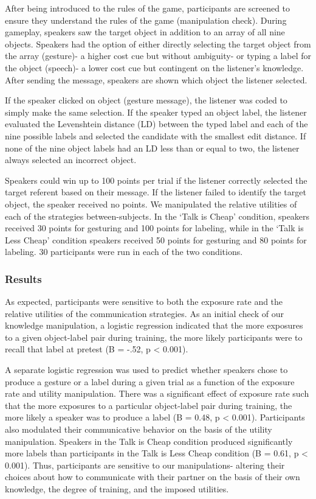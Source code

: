 \documentclass[10pt, letterpaper]{article}
\begin{document}
After being introduced to the rules of the game, participants are
screened to ensure they understand the rules of the game (manipulation
check). During gameplay, speakers saw the target object in addition to
an array of all nine objects. Speakers had the option of either directly
selecting the target object from the array (gesture)- a higher cost cue
but without ambiguity- or typing a label for the object (speech)- a
lower cost cue but contingent on the listener's knowledge. After sending
the message, speakers are shown which object the listener selected.

If the speaker clicked on object (gesture message), the listener was
coded to simply make the same selection. If the speaker typed an object
label, the listener evaluated the Levenshtein distance (LD) between the
typed label and each of the nine possible labels and selected the
candidate with the smallest edit distance. If none of the nine object
labels had an LD less than or equal to two, the listener always selected
an incorrect object.

Speakers could win up to 100 points per trial if the listener correctly
selected the target referent based on their message. If the listener
failed to identify the target object, the speaker received no points. We
manipulated the relative utilities of each of the strategies
between-subjects. In the `Talk is Cheap' condition, speakers received 30
points for gesturing and 100 points for labeling, while in the `Talk is
Less Cheap' condition speakers received 50 points for gesturing and 80
points for labeling. 30 participants were run in each of the two
conditions.

\subsubsection{Results}\label{results}

As expected, participants were sensitive to both the exposure rate and
the relative utilities of the communication strategies. As an initial
check of our knowledge manipulation, a logistic regression indicated
that the more exposures to a given object-label pair during training,
the more likely participants were to recall that label at pretest (B =
-.52, p \textless{} 0.001).

A separate logistic regression was used to predict whether speakers
chose to produce a gesture or a label during a given trial as a function
of the exposure rate and utility manipulation. There was a significant
effect of exposure rate such that the more exposures to a particular
object-label pair during training, the more likely a speaker was to
produce a label (B = 0.48, p \textless{} 0.001). Participants also
modulated their communicative behavior on the basis of the utility
manipulation. Speakers in the Talk is Cheap condition produced
significantly more labels than participants in the Talk is Less Cheap
condition (B = 0.61, p \textless{} 0.001). Thus, participants are
sensitive to our manipulations- altering their choices about how to
communicate with their partner on the basis of their own knowledge, the
degree of training, and the imposed utilities.
\end{document}
